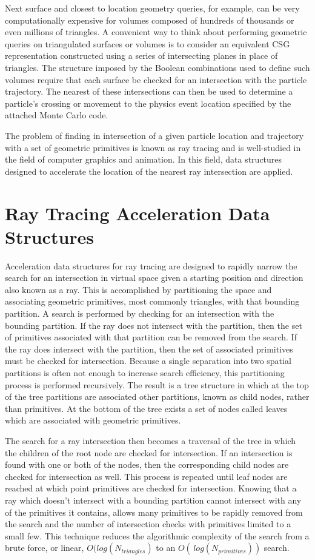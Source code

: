Next surface and closest to location geometry queries, for example, can be very
computationally expensive for volumes composed of hundreds of thousands or even
millions of triangles. A convenient way to think about performing geometric queries on
triangulated surfaces or volumes is to consider an equivalent CSG representation
constructed using a series of intersecting planes in place of triangles. The
structure imposed by the Boolean combinations used to define such volumes
require that each surface be checked for an intersection with the particle
trajectory. The nearest of these intersections can then be used to determine a
particle's crossing or movement to the physics event location specified by the
attached Monte Carlo code.

The problem of finding in intersection of a given particle location and
trajectory with a set of geometric primitives is known as ray tracing and is
well-studied in the field of computer graphics and animation. In this field,
data structures designed to accelerate the location of the nearest ray
intersection are applied.

\section{Ray Tracing Acceleration Data Structures}

Acceleration data structures for ray tracing are designed to rapidly narrow the
search for an intersection in virtual space given a starting position and
direction also known as a ray. This is accomplished by partitioning the space
and associating geometric primitives, most commonly triangles, with that
bounding partition. A search is performed by checking for an intersection with
the bounding partition. If the ray does not intersect with the partition, then
the set of primitives associated with that partition can be removed from the
search. If the ray does intersect with the partition, then the set of associated
primitives must be checked for intersection. Because a single separation into
two spatial partitions is often not enough to increase search efficiency, this
partitioning process is performed recursively. The result is a tree structure in
which at the top of the tree partitions are associated other partitions, known
as child nodes, rather than primitives. At the bottom of the tree exists a set of
nodes called leaves which are associated with geometric primitives. 

The search for a ray intersection then becomes a traversal of the tree
in which the children of the root node are checked for intersection. If an
intersection is found with one or both of the nodes, then the corresponding child nodes 
are checked for intersection as well. This process is repeated until leaf nodes
are reached at which point primitives are checked for intersection. Knowing that
a ray which doesn't intersect with a bounding partition cannot intersect with
any of the primitives it contains, allows many primitives to be rapidly removed
from the search and the number of intersection checks with primitives limited to
a small few. This technique reduces the algorithmic complexity of the search
from a brute force, or linear, $O(log(N_{triangles})$ to an $O(\,
log(N_{primitives}))$ search. 

